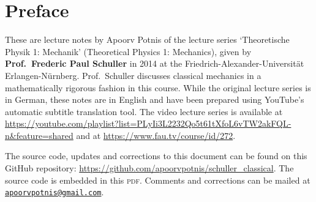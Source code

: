 \documentclass[a4 paper, 11pt]{book}
\theoremstyle{definition}
\begin{document}

    \begin{titlepage}
        \maketitle
        \thispagestyle{empty}   %
    \end{titlepage}    
    
    
    \frontmatter

    \hypertarget{Preface}{}
    \chapter*{Preface}
    
    These are lecture notes by Apoorv Potnis of the lecture series `Theoretische Physik 1: Mechanik' (Theoretical Physics 1: Mechanics), given by \textbf{Prof.\ Frederic Paul Schuller} in 2014 at the Friedrich-Alexander-Universität Erlangen-Nürnberg. Prof.\ Schuller discusses classical mechanics in a mathematically rigorous fashion in this course. While the original lecture series is in German, these notes are in English and have been prepared using YouTube's automatic subtitle translation tool. The video lecture series is available at \url{https://youtube.com/playlist?list=PLyIi3L2232Qo5t61tXfoL6vTW2akFQL-n&feature=shared} and at \url{https://www.fau.tv/course/id/272}.

    The source code, updates and corrections to this document can be found on this GitHub repository: \url{https://github.com/apoorvpotnis/schuller_classical}. The source code is embedded in this \textsc{pdf}. Comments and corrections can be mailed at \href{mailto:apoorvpotnis@gmail.com}{\texttt{apoorvpotnis@gmail.com}}.

    \clearpage
    
    \cleardoublepage      %
    \tableofcontents
    
\end{document}
